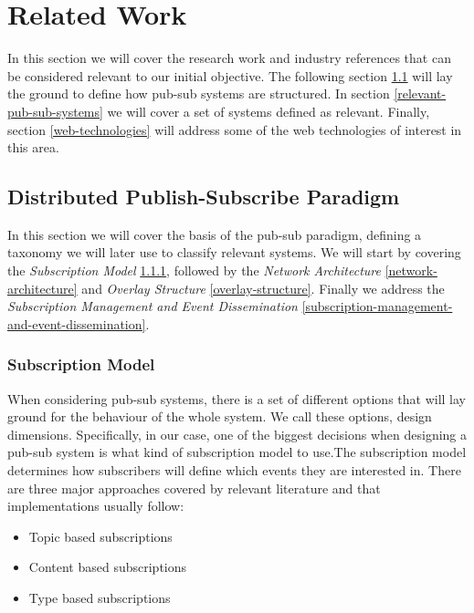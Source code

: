 
%
%

\section{Related Work}

In this section we will cover the research work and industry references
that can be considered relevant to our initial objective. The following section \ref{distributed-publish-subscribe-paradigm}
will lay the ground to define how pub-sub systems are structured. In section \ref{relevant-pub-sub-systems}
we will cover a set of systems defined as relevant. Finally, section \ref{web-technologies} will
address some of the web technologies of interest in this area.

\subsection{Distributed Publish-Subscribe
Paradigm}\label{distributed-publish-subscribe-paradigm}

In this section we will cover the basis of the pub-sub paradigm, defining a
taxonomy we will later use to classify relevant systems. We will start by covering
the \emph{Subscription Model} \ref{subscription-model}, followed by the \emph{Network Architecture}
\ref{network-architecture} and \emph{Overlay Structure} \ref{overlay-structure}. Finally
we address the \emph{Subscription Management and Event Dissemination}
\ref{subscription-management-and-event-dissemination}.

\subsubsection{Subscription Model}\label{subscription-model}

When considering pub-sub systems, there is a set of different options
that will lay ground for the behaviour of the whole system. We call
these options, design dimensions. Specifically, in our case, one of the
biggest decisions when designing a pub-sub system is what kind of
subscription model to use.The subscription model determines how
subscribers will define which events they are interested in. There are
three major approaches covered by relevant literature \cite{Kermarrec2013} \cite{Eugster2003}
and that implementations usually follow:

\begin{itemize}
  \item
    Topic based subscriptions
  \item
    Content based subscriptions
  \item
    Type based subscriptions
\end{itemize}

